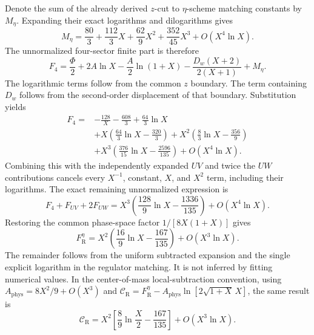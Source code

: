 Denote the sum of the already derived $z$-cut to $\eta$-scheme
matching constants by $M_\eta$. Expanding their exact logarithms
and dilogarithms gives
\begin{equation}
 M_\eta=\frac{80}{3}+\frac{112}{3}X+\frac{62}{9}X^2
                              +\frac{352}{45}X^3+O(X^4\ln X).
\end{equation}
The unnormalized four-sector finite part is therefore
\begin{equation}
 F_4=\frac{\Phi}{2}+2A\ln X-\frac A2\ln(1+X)
                     -\frac{D_w(X+2)}{2(X+1)}+M_\eta.
\end{equation}
The logarithmic terms follow from the common $z$ boundary. The
term containing $D_w$ follows from the second-order displacement
of that boundary. Substitution yields
\begin{align}
 F_4={}&-\frac{128}{X}-\frac{608}{3}+\frac{64}{3}\ln X\\
 &+X\left(\frac{64}{3}\ln X-\frac{320}{3}\right)
 +X^2\left(\frac83\ln X-\frac{356}{9}\right)\\
 &+X^3\left(\frac{376}{15}\ln X-\frac{2596}{135}\right)
                                     +O(X^4\ln X).
\end{align}
Combining this with the independently expanded $UV$ and twice
the $UW$ contributions cancels every $X^{-1}$, constant, $X$,
and $X^2$ term, including their logarithms. The exact remaining
unnormalized expression is
\begin{equation}
 F_4+F_{UV}+2F_{UW}
 =X^3\left(\frac{128}{9}\ln X-\frac{1336}{135}\right)
                                      +O(X^4\ln X).
\end{equation}
Restoring the common phase-space factor $1/[8X(1+X)]$ gives
\begin{equation}
 \boxed{F_{\mathrm R}^{\eta}
 =X^2\left(\frac{16}{9}\ln X-\frac{167}{135}\right)
                                      +O(X^3\ln X).}
\end{equation}
The remainder follows from the uniform subtracted expansion and
the single explicit logarithm in the regulator matching. It is
not inferred by fitting numerical values. In the center-of-mass
local-subtraction convention, using
$A_{\mathrm{phys}}=8X^2/9+O(X^3)$ and
$\mathcal C_{\mathrm R}=F_{\mathrm R}^{\eta}
 -A_{\mathrm{phys}}\ln[2\sqrt{1+X}\,X]$, the same result is
\begin{equation}
 \mathcal C_{\mathrm R}
 =X^2\left[\frac89\ln\frac{X}{2}-\frac{167}{135}\right]
                                      +O(X^3\ln X).
\end{equation}

